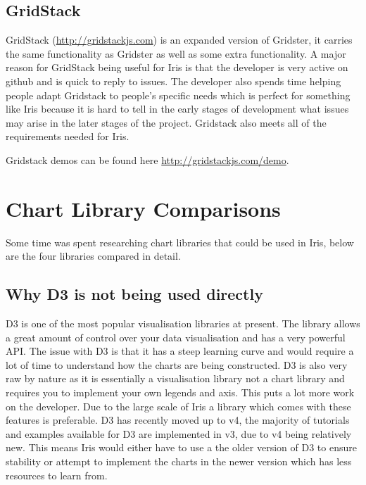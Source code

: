 \documentclass[12pt,a4paper,titlepage]{report}
\begin{document}
\begin{appendices}
\section{GridStack}

GridStack (\url{http://gridstackjs.com}) is an expanded version of Gridster, it carries the same functionality as Gridster as well as some extra functionality. A major reason for GridStack being useful for Iris is that the developer is very active on github and is quick to reply to issues. The developer also spends time helping people adapt Gridstack to people's specific needs which is perfect for something like Iris because it is hard to tell in the early stages of development what issues may arise in the later stages of the project. Gridstack also meets all of the requirements needed for Iris.

Gridstack demos can be found here \url{http://gridstackjs.com/demo}.



\chapter{Chart Library Comparisons}\label{sec:charts}

Some time was spent researching chart libraries that could be used in Iris, below are the four libraries compared in detail.

\section{Why D3 is not being used directly}

D3 is one of the most popular visualisation libraries at present. The library allows a great amount of control over your data visualisation and has a very powerful API. The issue with D3 is that it has a steep learning curve and would require a lot of time to understand how the charts are being constructed. D3 is also very raw by nature as it is essentially a visualisation library not a chart library and requires you to implement your own legends and axis. This puts a lot more work on the developer. Due to the large scale of Iris a library which comes with these features is preferable. D3 has recently moved up to v4, the majority of tutorials and examples available for D3 are implemented in v3, due to v4 being relatively new. This means Iris would either have to use a the older version of D3 to ensure stability or attempt to implement the charts in the newer version which has less resources to learn from.


\end{appendices}
\end{document}
